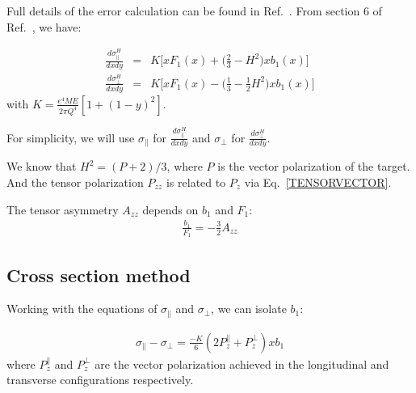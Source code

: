 \label{APPERR}
Full details of the error calculation can be found in Ref.~\cite{SOLVI}.
%
From section 6 of Ref.~\cite{Hoodbhoy:1988am},
we have:

\begin{eqnarray}
\frac{d\sigma_{\parallel}^H}{dxdy} & = & K \Bigg[x F_1(x) + \Big(\frac{2}{3} - H^2\Big) x b_1(x) \Bigg]\\
\frac{d\sigma_{\perp}^H}{dxdy}    & = & K \Bigg[x F_1(x) - \Big(\frac{1}{3} - \frac{1}{2}H^2\Big) x b_1(x) \Bigg]
\label{xs} 
\end{eqnarray}
%
with $K = \frac{e^4 M E}{2 \pi Q^4} [1+(1-y)^2]$.

For simplicity, we will use $\sigma_{\parallel}$ for $\frac{d\sigma_{\parallel}^H}{dxdy}$ and $\sigma_{\perp}$ for $\frac{d\sigma_{\perp}^H}{dxdy}$.


We know that $H^2 = (P+2)/3$, where $P$ is the vector polarization of the target. 
And the tensor polarization $P_{zz}$ is related to $P_z$ via Eq.~\ref{TENSORVECTOR}.

The tensor asymmetry $A_{zz}$ depends on $b_1$ and $F_1$:
\begin{eqnarray}
\frac{b_1}{F_1} = - \frac{3}{2} A_{zz}
\label{none} 
\end{eqnarray}

\subsection{Cross section method}

Working with the equations of $\sigma_{\parallel}$ and $\sigma_{\perp}$, we can isolate $b_{1}$:

\begin{eqnarray}
\sigma_{\parallel} - \sigma_{\perp} = \frac{-K}{6} (2 P_z^{\parallel} + P_z^{\perp}) x b_1
\label{MAIN}
\end{eqnarray}
where $P_z^{\parallel}$ and $P_z^{\perp}$ are the vector polarization achieved in the longitudinal and transverse configurations respectively.
%

